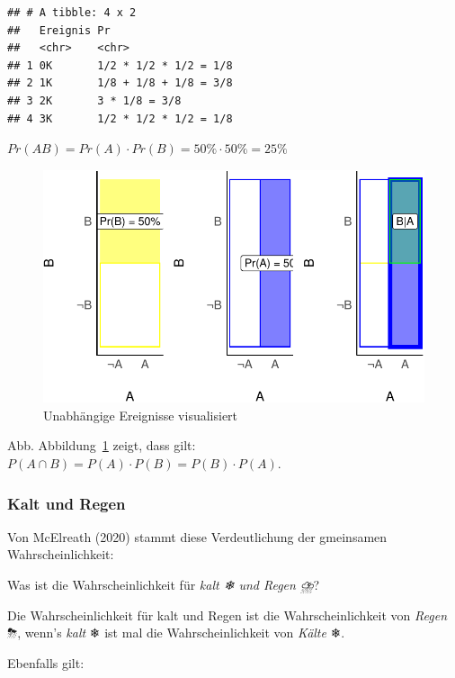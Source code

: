 \documentclass[
  a4paper,
  DIV=11]{scrreprt}
\theoremstyle{definition}
\theoremstyle{remark}
\begin{document}
\begin{verbatim}
## # A tibble: 4 x 2
##   Ereignis Pr                   
##   <chr>    <chr>                
## 1 0K       1/2 * 1/2 * 1/2 = 1/8
## 2 1K       1/8 + 1/8 + 1/8 = 3/8
## 3 2K       3 * 1/8 = 3/8        
## 4 3K       1/2 * 1/2 * 1/2 = 1/8
\end{verbatim}

\(Pr(AB) = Pr(A) \cdot Pr(B) = 50\% \cdot 50\% = 25\%\)

\begin{figure}

{\centering \includegraphics{./Wskt_files/figure-pdf/fig-unabh-e-1.pdf}

}

\caption{\label{fig-unabh-e}Unabhängige Ereignisse visualisiert}

\end{figure}

Abb. Abbildung~\ref{fig-unabh-e} zeigt, dass gilt:
\(P(A\cap B) = P(A) \cdot P(B) = P(B) \cdot P(A)\).

\hypertarget{kalt-und-regen}{%
\subsubsection{Kalt und Regen}\label{kalt-und-regen}}

Von McElreath (2020) stammt diese Verdeutlichung der gmeinsamen
Wahrscheinlichkeit:

Was ist die Wahrscheinlichkeit für \emph{kalt ❄ und Regen ⛈️}?

Die Wahrscheinlichkeit für kalt und Regen ist die Wahrscheinlichkeit von
\emph{Regen} ⛈, wenn's \emph{kalt} ❄ ist mal die Wahrscheinlichkeit von
\emph{Kälte} ❄.

Ebenfalls gilt:
\end{document}

